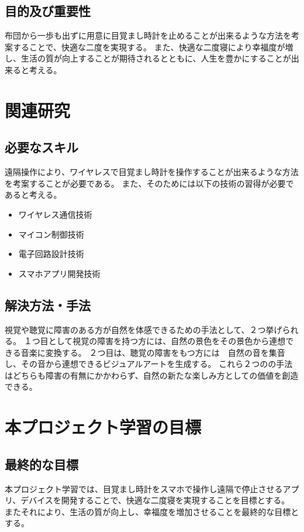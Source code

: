 \section{目的及び重要性}
布団から一歩も出ずに用意に目覚まし時計を止めることが出来るような方法を考案することで、快適な二度を実現する。
また、快適な二度寝により幸福度が増し、生活の質が向上することが期待されるとともに、人生を豊かにすることが出来ると考える。

\chapter{関連研究}
\section{必要なスキル}
遠隔操作により、ワイヤレスで目覚まし時計を操作することが出来るような方法を考案することが必要である。
また、そのためには以下の技術の習得が必要であると考える。
\begin{itemize}
    \item ワイヤレス通信技術
    \item マイコン制御技術
    \item 電子回路設計技術
    \item スマホアプリ開発技術
\end{itemize}

\section{解決方法・手法}
視覚や聴覚に障害のある方が自然を体感できるための手法として、２つ挙げられる。
１つ目として視覚の障害を持つ方には、自然の景色をその景色から連想できる音楽に変換する。
２つ目は、聴覚の障害をもつ方には　自然の音を集音し、その音から連想できるビジュアルアートを生成する。
これら２つのの手法はどちらも障害の有無にかかわらず、自然の新たな楽しみ方としての価値を創造できる。

\chapter{本プロジェクト学習の目標}
\section{最終的な目標}
本プロジェクト学習では、目覚まし時計をスマホで操作し遠隔で停止させるアプリ、デバイスを開発することで、快適な二度寝を実現することを目標とする。
またそれにより、生活の質が向上し、幸福度を増加させることを最終的な目標とする。

